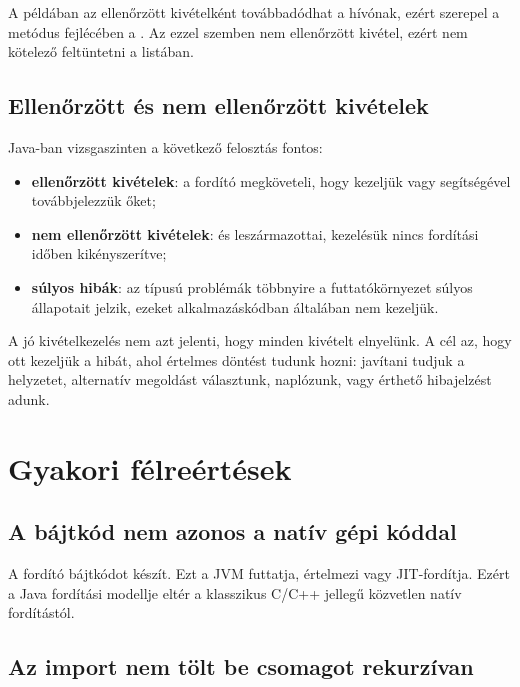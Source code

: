 
A példában az  ellenőrzött kivételként továbbadódhat a hívónak, ezért szerepel a metódus fejlécében a . Az  ezzel szemben nem ellenőrzött kivétel, ezért nem kötelező feltüntetni a  listában.

\subsection{Ellenőrzött és nem ellenőrzött kivételek}

Java-ban vizsgaszinten a következő felosztás fontos:

\begin{itemize}
  \item \textbf{ellenőrzött kivételek}: a fordító megköveteli, hogy kezeljük vagy  segítségével továbbjelezzük őket;
  \item \textbf{nem ellenőrzött kivételek}:  és leszármazottai, kezelésük nincs fordítási időben kikényszerítve;
  \item \textbf{súlyos hibák}: az  típusú problémák többnyire a futtatókörnyezet súlyos állapotait jelzik, ezeket alkalmazáskódban általában nem kezeljük.
\end{itemize}

A jó kivételkezelés nem azt jelenti, hogy minden kivételt elnyelünk. A cél az, hogy ott kezeljük a hibát, ahol értelmes döntést tudunk hozni: javítani tudjuk a helyzetet, alternatív megoldást választunk, naplózunk, vagy érthető hibajelzést adunk.

\section{Gyakori félreértések}

\subsection{A bájtkód nem azonos a natív gépi kóddal}

A  fordító  bájtkódot készít. Ezt a JVM futtatja, értelmezi vagy JIT-fordítja. Ezért a Java fordítási modellje eltér a klasszikus C/C++ jellegű közvetlen natív fordítástól.

\subsection{Az import nem tölt be csomagot rekurzívan}

